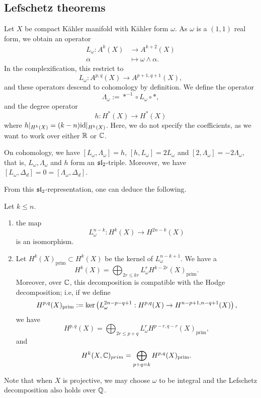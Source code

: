 \subsection{Lefschetz theorems}
Let $X$ be compact Kähler manifold with Kähler form $\omega$. As $\omega$ is a $(1,1)$ real form, we obtain an operator
%
\begin{align*}
L_\omega: A^k(X)&\to A^{k+2}(X)\\
\alpha&\mapsto\omega\wedge\alpha.
\end{align*}
In the complexification, this restrict to
\[
L_\omega: A^{p,q}(X)\to A^{p+1,q+1}(X),
\]
and these operators descend to cohomology by definition.	
We define the operator
\[
\Lambda_\omega:=*^{-1}\circ L_\omega\circ *,
\]	
%
and the degree operator
%
\[
h:H^*(X)\to H^*(X)
\]
where $h|_{H^k(X)}=(k-n)\text{id}|_{H^k(X)}$. Here, we do not specify the coefficients, as we want to work over either $\mathbb R$ or $\mathbb C$.
\begin{theorem}
	On cohomology, we have $[L_\omega,\Lambda_\omega]=h$, $[h,L_\omega]=2L_\omega$ and $[2,\Lambda_\omega]=-2\Lambda_\omega$, that is, $L_\omega,\Lambda_\omega$ and $h$ form an $\mathfrak{s}\mathfrak l_2$-triple. Moreover, we have $[L_\omega,\Delta_d]=0=[\Lambda_\omega,\Delta_d]$.
\end{theorem}
From this $\mathfrak{s}\mathfrak l_2$-representation, one can deduce the following.
\begin{theorem}
	Let $k\leq n$. 
	\begin{enumerate}
		\item the map 	\[
		L_\omega^{n-k}:H^k(X)\to H^{2n-k}(X)
		\]
		is an isomorphism.
		\item
Let $H^k(X)_{\text{prim}}\subset H^k(X)$ be the kernel of $L_\omega^{n-k+1}$. We have a 
%
\[
H^k(X)=\bigoplus_{2r\leq kr}L_\omega^rH^{k-2r}(X)_{\text{prim}}.
\]
Moreover, over $\mathbb C$, this decomposition is compatible with the Hodge decomposition; i.e, if we define 
\[
H^{p,q}(X)_{\text{prim}}:=\ker\left(L_\omega^{2n-p-q+1}:H^{p,q}(X)\to H^{n-p+1,n-q+1}(X)\right),
\]
we have 
\[
H^{p,q}(X)=\bigoplus_{2r\leq p+q}L_\omega^rH^{p-r,q-r}(X)_{\text{prim}},
\]
and 
\[
H^k(X,\mathbb C)_{prim}=\bigoplus_{p+q=k}H^{p,q}(X)_{\text{prim}}.
\]
\end{enumerate}
\end{theorem}
\begin{remark}
	Note that when $X$ is projective, we may choose $\omega$ to be integral and the Lefschetz decomposition also holds over $\mathbb{Q}$.
\end{remark}
